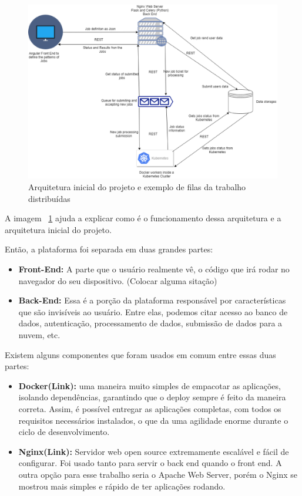 \documentclass[11pt,twoside]{article}
\begin{document}
\begin{figure}[!h]
  \centering
  \includegraphics[scale=0.4]{arch.eps}
  \caption{Arquitetura inicial do projeto e exemplo de filas da trabalho distribuídas}
  \label{fig:archtec}
\end{figure}

A imagem ~\ref{fig:archtec} ajuda a explicar como é o funcionamento dessa arquitetura e a arquitetura inicial do projeto.

Então, a plataforma foi separada em duas grandes partes:

\begin{itemize}
  \item \textbf{Front-End:} A parte que o usuário realmente vê, o código que irá rodar no navegador do seu dispositivo. (Colocar alguma sitação)
  \item \textbf{Back-End:} Essa é a porção da plataforma responsável por características que são invisíveis ao usuário. Entre elas, podemos citar acesso ao banco de dados, autenticação, processamento de dados,
  submissão de dados para a nuvem, etc.
\end{itemize}

Existem alguns componentes que foram usados em comum entre essas duas partes:

\begin{itemize}
  \item \textbf{Docker(Link):} uma maneira muito simples de empacotar as aplicações, isolando dependências, garantindo que o deploy sempre é feito da maneira correta. Assim, é possível entregar as aplicações completas, com
  todos os requisitos necessários instalados, o que da uma agilidade enorme durante o ciclo de desenvolvimento.
  \item \textbf{Nginx(Link):} Servidor web open source extremamente escalável e fácil de configurar. Foi usado tanto para servir o back end quando o front end. A outra opção para esse trabalho seria o Apache Web Server, porém
  o Nginx se mostrou mais simples e rápido de ter aplicações rodando.
\end{itemize}
\end{document}
